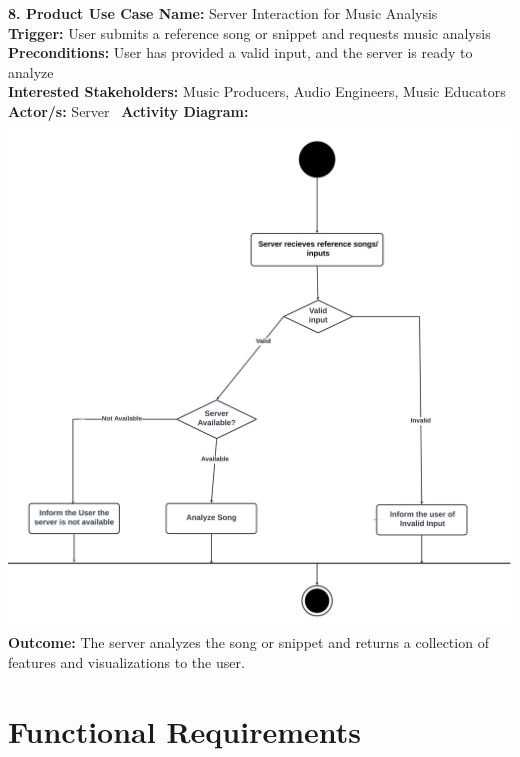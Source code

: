 \documentclass[12pt]{article}
\begin{document}
\textbf{8. Product Use Case Name:} Server Interaction for Music Analysis \\
\textbf{Trigger:} User submits a reference song or snippet and requests music analysis \\
\textbf{Preconditions:} User has provided a valid input, and the server is ready to analyze \\
\textbf{Interested Stakeholders:} Music Producers, Audio Engineers, Music Educators \\
\textbf{Actor/s:} Server \ \textbf{Activity Diagram:} \\
\includegraphics[width=\textwidth]{server_song_analysis.png} \\
\textbf{Outcome:} The server analyzes the song or snippet and returns a collection of features and visualizations to the user.

\section{Functional Requirements}
\end{document}
